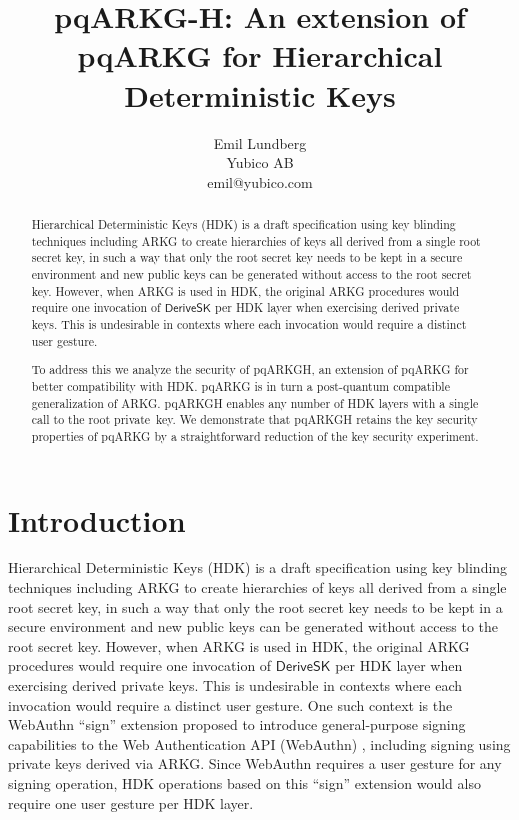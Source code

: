 \documentclass[a4paper,11pt]{article}
\author{Emil Lundberg\\Yubico AB\\emil@yubico.com}
\title{pqARKG-H: An extension of pqARKG for Hierarchical Deterministic Keys}
\newcommand{\ALGNAME}{pqARKG\babelhyphen{nobreak}H\xspace}
\newcommand{\ALGBASE}{pqARKG\xspace}
\newcommand{\algname}[1]{\ensuremath{\mathsf{#1}}\xspace}
\newcommand{\algdsk}{\algname{DeriveSK}}
\begin{document}
\maketitle

\begin{abstract}
Hierarchical Deterministic Keys (HDK) is a draft specification
using key blinding techniques including ARKG
to create hierarchies of keys all derived from a single root secret key,
in such a way that only the root secret key needs to be kept in a secure environment
and new public keys can be generated without access to the root secret key.
However, when ARKG is used in HDK, the original ARKG procedures
would require one invocation of \algdsk per HDK layer when exercising derived private keys.
This is undesirable in contexts where each invocation would require a distinct user gesture.

To address this we analyze the security of \ALGNAME, an extension of \ALGBASE for better compatibility with HDK.
\ALGBASE is in turn a post-quantum compatible generalization of ARKG.
\ALGNAME enables any number of HDK layers with a single call to the root private~key.
We demonstrate that \ALGNAME retains the key security properties of \ALGBASE
by a straightforward reduction of the key security experiment.
\end{abstract}


\section{Introduction}
Hierarchical Deterministic Keys (HDK) \cite{HDK} is a draft specification
using key blinding techniques including ARKG \cite{ARKG}
to create hierarchies of keys all derived from a single root secret key,
in such a way that only the root secret key needs to be kept in a secure environment
and new public keys can be generated without access to the root secret key.
However, when ARKG is used in HDK, the original ARKG procedures
would require one invocation of \algdsk per HDK layer when exercising derived private keys.
This is undesirable in contexts where each invocation would require a distinct user gesture.
One such context is the WebAuthn ``sign'' extension \cite{webauthn-sign}
proposed to introduce general-purpose signing capabilities to the Web Authentication API (WebAuthn) \cite{webauthn},
including signing using private keys derived via ARKG.
Since WebAuthn requires a user gesture for any signing operation,
HDK operations based on this ``sign'' extension would also require one user gesture per HDK layer.
\end{document}
